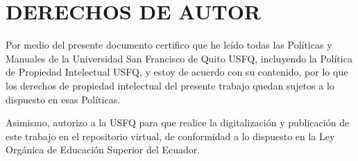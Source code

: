 \section*{\textcopyright{} DERECHOS DE AUTOR}

Por medio del presente documento certifico que he leído todas las Políticas y Manuales de la Universidad San Francisco de Quito USFQ, incluyendo la Política de Propiedad Intelectual USFQ, y estoy de acuerdo con su contenido, por lo que los derechos de propiedad intelectual del presente trabajo quedan sujetos a lo dispuesto en esas Políticas.

Asimismo, autorizo a la USFQ para que realice la digitalización y publicación de este trabajo en el repositorio virtual, de conformidad a lo dispuesto en la Ley Orgánica de Educación Superior del Ecuador.

\vspace{1.0cm}

